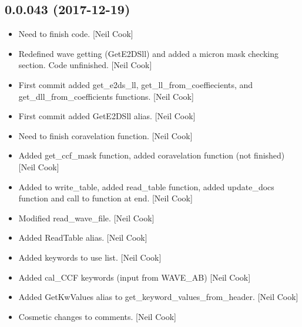 \documentclass[a4paper,10pt,english]{report}
\begin{document}
\subsection{0.0.043 (2017-12-19)}
\label{\detokenize{misc/changelog:id507}}\begin{itemize}
\item {} 
Need to finish code. {[}Neil Cook{]}

\item {} 
Redefined wave getting (GetE2DSll) and added a micron mask checking
section. Code unfinished. {[}Neil Cook{]}

\item {} 
First commit added get\_e2ds\_ll, get\_ll\_from\_coeffiecients, and
get\_dll\_from\_coefficients functions. {[}Neil Cook{]}

\item {} 
First commit added GetE2DSll alias. {[}Neil Cook{]}

\item {} 
Need to finish coravelation function. {[}Neil Cook{]}

\item {} 
Added get\_ccf\_mask function, added coravelation function (not
finished) {[}Neil Cook{]}

\item {} 
Added to write\_table, added read\_table function, added update\_docs
function and call to function at end. {[}Neil Cook{]}

\item {} 
Modified read\_wave\_file. {[}Neil Cook{]}

\item {} 
Added ReadTable alias. {[}Neil Cook{]}

\item {} 
Added keywords to use list. {[}Neil Cook{]}

\item {} 
Added cal\_CCF keywords (input from WAVE\_AB) {[}Neil Cook{]}

\item {} 
Added GetKwValues alias to get\_keyword\_values\_from\_header. {[}Neil Cook{]}

\item {} 
Cosmetic changes to comments. {[}Neil Cook{]}

\end{itemize}
\end{document}
